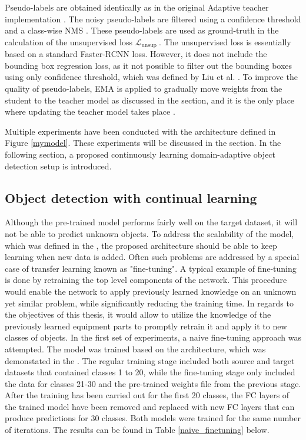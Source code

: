 Pseudo-labels are obtained identically as in the original Adaptive teacher implementation \cite{Li2021}. The noisy pseudo-labels are filtered using a confidence threshold and a class-wise NMS \cite{Liu2021}. These pseudo-labels are used as ground-truth in the calculation of the unsupervised loss $\mathcal{L}_{\text {unsup }}$. The unsupervised loss is essentially based on a standard Faster-RCNN loss. However, it does not include the bounding box regression loss, as it not possible to filter out the bounding boxes using only confidence threshold, which was defined   by Liu et al. \cite{Liu2021}.  To improve the quality of pseudo-labels, EMA is applied to gradually move weights from the student to the teacher model as discussed in the   section, and it is the only place where updating the teacher model takes place \cite{Li2021}.  
 
Multiple experiments have been conducted with the architecture defined in Figure \ref{mymodel}. These experiments will be discussed in the  section. In the following section, a proposed continuously learning domain-adaptive object detection setup is introduced. 

\FloatBarrier

\subsection{Object detection with continual learning}
\label{cont_learning_section} 
Although the pre-trained model performs fairly well on the target dataset, it will not be able to predict unknown objects. To address the scalability of the model, which was defined in the , the proposed architecture should be able to keep learning when new data is added. Often such problems are addressed by a special case of transfer learning known as "fine-tuning". A typical example of fine-tuning is done by retraining the top level components of the network. This procedure would enable the network to apply previously learned knowledge on an unknown yet similar problem, while significantly reducing the training time. In regards to the objectives of this thesis, it would allow to utilize the knowledge of the previously learned equipment parts to promptly retrain it and apply it to new classes of objects. 
In the first set of experiments, a naive fine-tuning approach was attempted. The model was trained based on the architecture, which was demonstated in the . The regular training stage included both source and target datasets that contained classes 1 to 20, while the fine-tuning stage only included the data for classes 21-30 and the pre-trained weights file from the previous stage. After the training has been carried out for the first 20 classes, the FC layers of the trained model have been removed and replaced with new FC layers that can produce predictions for 30 classes. Both models were trained for the same number of iterations. The results can be found in Table \ref{naive_finetuning} below.

